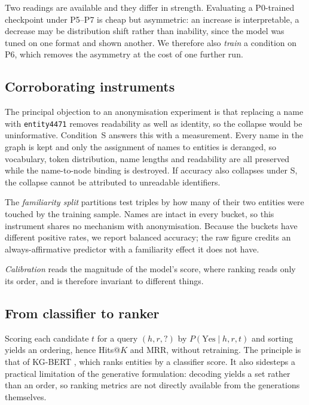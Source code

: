 \documentclass[conference]{IEEEtran}
\begin{document}
Two readings are available and they differ in strength. Evaluating a P0-trained
checkpoint under P5--P7 is cheap but asymmetric: an increase is interpretable,
a decrease may be distribution shift rather than inability, since the model was
tuned on one format and shown another. We therefore also \emph{train} a
condition on P6, which removes the asymmetry at the cost of one further run.

\subsection{Corroborating instruments}
\label{sec:instruments}

The principal objection to an anonymisation experiment is that replacing a name
with \texttt{entity4471} removes readability as well as identity, so the
collapse would be uninformative. Condition~S answers this with a measurement.
Every name in the graph is kept and only the assignment of names to entities is
deranged, so vocabulary, token distribution, name lengths and readability are
all preserved while the name-to-node binding is destroyed. If accuracy also
collapses under S, the collapse cannot be attributed to unreadable identifiers.

The \emph{familiarity split} partitions test triples by how many of their two
entities were touched by the training sample. Names are intact in every bucket,
so this instrument shares no mechanism with anonymisation. Because the buckets
have different positive rates, we report balanced accuracy; the raw figure
credits an always-affirmative predictor with a familiarity effect it does not
have.

\emph{Calibration} reads the magnitude of the model's score, where ranking reads
only its order, and is therefore invariant to different things.

\subsection{From classifier to ranker}
\label{sec:rank}

Scoring each candidate $t$ for a query $(h,r,?)$ by $P(\text{Yes}\mid h,r,t)$
and sorting yields an ordering, hence Hits@$K$ and MRR, without retraining. The
principle is that of KG-BERT \cite{kgbert}, which ranks entities by a classifier
score. It also sidesteps a practical limitation of the generative formulation:
decoding yields a set rather than an order, so ranking metrics are not directly
available from the generations themselves.
\end{document}
